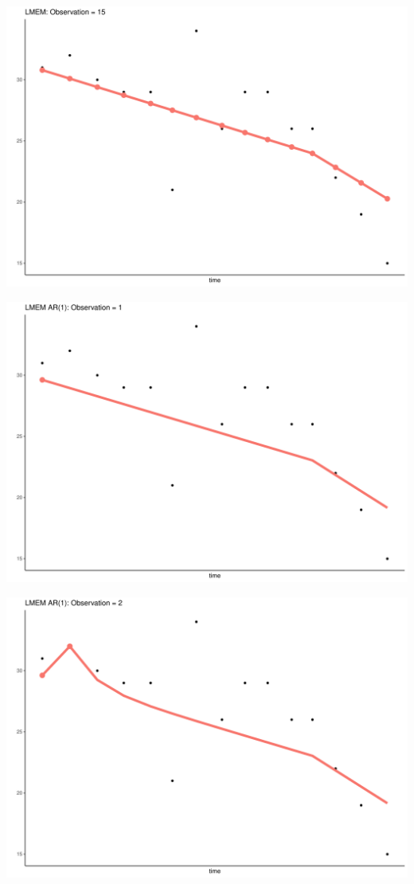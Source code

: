 \documentclass[
  ignorenonframetext,
]{beamer}
\begin{document}
\begin{frame}{}
\protect\hypertarget{section-14}{}
\includegraphics{Prez4_files/figure-beamer/unnamed-chunk-13-15.pdf}
\end{frame}

\begin{frame}{}
\protect\hypertarget{section-15}{}
\includegraphics{Prez4_files/figure-beamer/unnamed-chunk-14-1.pdf}
\end{frame}

\begin{frame}{}
\protect\hypertarget{section-16}{}
\includegraphics{Prez4_files/figure-beamer/unnamed-chunk-14-2.pdf}
\end{frame}
\end{document}
